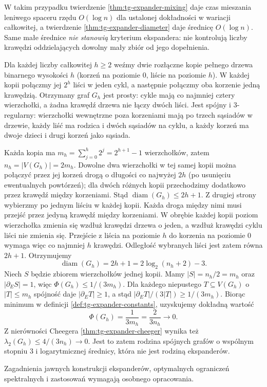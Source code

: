 W takim przypadku
twierdzenie
\ref{thm:tg-expander-mixing}
daje czas mieszania
leniwego spaceru
rzędu $O(\log n)$
dla ustalonej dokładności
w wariacji całkowitej,
a twierdzenie
\ref{thm:tg-expander-diameter}
daje średnicę $O(\log n)$.
Same małe średnice
\emph{nie stanowią}
kryterium ekspandera:
nie kontrolują
liczby krawędzi
oddzielających
dowolny mały zbiór
od jego dopełnienia.

\begin{przyklad}
\label{ex:tg-expander-small-diameter}
Dla każdej liczby całkowitej $h\geq2$ weźmy dwie rozłączne
kopie pełnego drzewa binarnego wysokości $h$ (korzeń na
poziomie $0$, liście na poziomie $h$). W każdej kopii połączmy
jej $2^h$ liści w jeden cykl, a następnie połączmy oba
korzenie jedną krawędzią. Otrzymany graf $G_h$ jest prosty:
cykle mają co najmniej cztery wierzchołki, a żadna krawędź
drzewa nie łączy dwóch liści. Jest spójny i $3$-regularny:
wierzchołki wewnętrzne poza korzeniami mają po trzech
sąsiadów w drzewie, każdy liść ma rodzica i dwóch sąsiadów
na cyklu, a każdy korzeń ma dwoje dzieci i drugi korzeń
jako sąsiada.

Każda kopia ma $m_h=\sum_{j=0}^h2^j=2^{h+1}-1$
wierzchołków, zatem $n_h=|V(G_h)|=2m_h$. Dowolne
dwa wierzchołki w tej samej kopii można połączyć
przez jej korzeń drogą o długości co najwyżej $2h$
(po usunięciu ewentualnych powtórzeń); dla dwóch
różnych kopii przechodzimy dodatkowo przez krawędź
między korzeniami. Stąd $\operatorname{diam}(G_h)\leq 2h+1$.
Z drugiej strony wybierzmy po jednym liściu w każdej
kopii. Każda droga między nimi musi przejść przez jedyną
krawędź między korzeniami. W obrębie każdej kopii
poziom wierzchołka zmienia się wzdłuż krawędzi drzewa
o jeden, a wzdłuż krawędzi cyklu liści nie zmienia się.
Przejście z liścia na poziomie $h$ do korzenia na
poziomie $0$ wymaga więc co najmniej $h$ krawędzi.
Odległość wybranych liści jest zatem równa $2h+1$.
Otrzymujemy
\[
\operatorname{diam}(G_h)=2h+1
=2\log_2(n_h+2)-3.
\]
Niech $S$ będzie zbiorem wierzchołków jednej kopii.
Mamy $|S|=n_h/2=m_h$ oraz $|\partial_E S|=1$,
więc $\Phi(G_h)\leq 1/(3m_h)$.
Dla każdego niepustego $T\subseteq V(G_h)$
o $|T|\leq m_h$ spójność daje $|\partial_E T|\geq1$,
a stąd $|\partial_E T|/(3|T|)\geq 1/(3m_h)$.
Biorąc minimum w definicji \ref{def:tg-expander-constants},
uzyskujemy dokładną wartość
\[
\Phi(G_h)=\frac{1}{3m_h}
=\frac{2}{3n_h}\longrightarrow0.
\]
Z nierówności Cheegera \ref{thm:tg-expander-cheeger}
wynika też $\lambda_2(G_h)\leq4/(3n_h)\to0$.
Jest to zatem rodzina spójnych grafów o wspólnym
stopniu $3$ i logarytmicznej średnicy, która nie jest
rodziną ekspanderów.
\end{przyklad}

Zagadnienia jawnych konstrukcji ekspanderów,
optymalnych ograniczeń spektralnych i zastosowań
wymagają osobnego opracowania.
